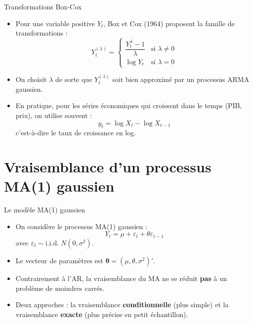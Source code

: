 \documentclass[11pt,aspectratio=169]{beamer}
\begin{document}
\begin{frame}{Transformations Box-Cox}

\begin{itemize}

\item Pour une variable positive $Y_t$, Box et Cox (1964) proposent la famille de transformations :
  \[
  Y_t^{(\lambda)} = \begin{cases} \dfrac{Y_t^{\lambda} - 1}{\lambda} & \text{si } \lambda \neq 0 \\[0.3cm] \log Y_t & \text{si } \lambda = 0 \end{cases}
  \]\newline

\item On choisit $\lambda$ de sorte que $Y_t^{(\lambda)}$ soit bien approximé par un processus ARMA gaussien.\newline

\item En pratique, pour les séries économiques qui croissent dans le temps (PIB, prix), on utilise souvent :
  \[
  y_t = \log X_t - \log X_{t-1}
  \]
  c'est-à-dire le taux de croissance en log.

\end{itemize}

\end{frame}

\section{Vraisemblance d'un processus MA(1) gaussien}

\begin{frame}{Le modèle MA(1) gaussien}

\begin{itemize}

\item On considère le processus MA(1) gaussien :
  \[
  Y_t = \mu + \varepsilon_t + \theta \varepsilon_{t-1}
  \]
  avec $\varepsilon_t \sim \text{i.i.d.}\; N(0, \sigma^2)$.\newline

\item Le vecteur de paramètres est $\bm{\theta} = (\mu, \theta, \sigma^2)'$.\newline

\item Contrairement à l'AR, la vraisemblance du MA ne se réduit \textbf{pas} à un problème de moindres carrés.\newline

\item Deux approches : la vraisemblance \textbf{conditionnelle} (plus simple) et la vraisemblance \textbf{exacte} (plus précise en petit échantillon).

\end{itemize}

\end{frame}
\end{document}
